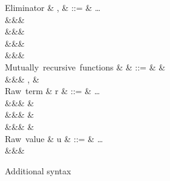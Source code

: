\begin{figure}
\begin{syntaxfig}
\mbox{Eliminator}
&
\sigma, \tau
&
::=
&
\ldots
\\
&&&
\elimBoolTrue{\kappa}
\\
&&&
\elimBoolFalse{\kappa}
\\
&&&
\elimListSingleton{\branchNil{\kappa}}
\\
&&&
\elimListSingleton{\branchCons{\sigma}}
\\[2mm]
\mbox{Mutually recursive functions}
&
\delta
&
::=
&
\seqEmpty
&
\\
&&&
, \delta
&
\\[2mm]
\mbox{Raw term}
&
r
&
::=
&
\ldots
\\
&&&
\exLambda{\sigma}
&
\\
&&&
&
\\
&&&
&
\\[2mm]
\mbox{Raw value}
&
u
&
::=
&
\ldots
\\
&&&
\exClosure{\rho}{\delta}{\sigma}
\end{syntaxfig}
\caption{Additional syntax}
\end{figure}
